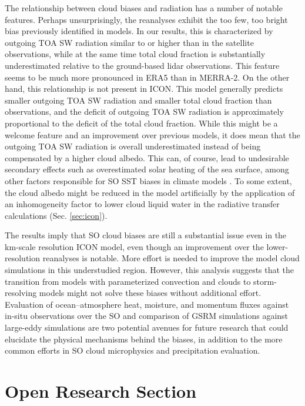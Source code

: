 \documentclass[draft]{agujournal2019}
\begin{document}
The relationship between cloud biases and radiation has a number of notable features. Perhaps unsurprisingly, the reanalyses exhibit the too few, too bright bias previously identified in models. In our results, this is characterized by outgoing TOA SW radiation similar to or higher than in the satellite observations, while at the same time total cloud fraction is substantially underestimated relative to the ground-based lidar observations. This feature seems to be much more pronounced in ERA5 than in MERRA-2. On the other hand, this relationship is not present in ICON. This model generally predicts smaller outgoing TOA SW radiation and smaller total cloud fraction than observations, and the deficit of outgoing TOA SW radiation is approximately proportional to the deficit of the total cloud fraction. While this might be a welcome feature and an improvement over previous models, it does mean that the outgoing TOA SW radiation is overall underestimated instead of being compensated by a higher cloud albedo. This can, of course, lead to undesirable secondary effects such as overestimated solar heating of the sea surface, among other factors responsible for SO SST biases in climate models \cite{zhang2023,luo2023,hyder2018}. To some extent, the cloud albedo might be reduced in the model artificially by the application of an inhomogeneity factor to lower cloud liquid water in the radiative transfer calculations (Sec. \ref{sec:icon}).

The results imply that SO cloud biases are still a substantial issue even in the km-scale resolution ICON model, even though an improvement over the lower-resolution reanalyses is notable. More effort is needed to improve the model cloud simulations in this understudied region. However, this analysis suggests that the transition from models with parameterized convection and clouds to storm-resolving models might not solve these biases without additional effort. Evaluation of ocean--atmosphere heat, moisture, and momentum fluxes against in-situ observations over the SO and comparison of GSRM simulations against large-eddy simulations are two potential avenues for future research that could elucidate the physical mechanisms behind the biases, in addition to the more common efforts in SO cloud microphysics and precipitation evaluation.

\section*{Open Research Section}
\end{document}
